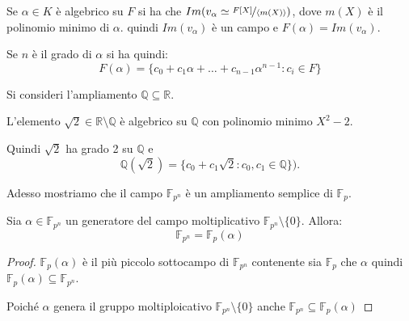 \documentclass[../main.tex]{subfiles}
\begin{document}
Se $\alpha \in K$ è algebrico su $F$ si ha che $Im(v_\alpha \simeq \nicefrac{F[X]}{\langle m(X)\rangle})$, dove $m(X)$ è il polinomio minimo di $\alpha$. quindi $Im(v_\alpha)$ è un campo e $F(\alpha) = Im(v_\alpha)$.

Se $n$ è il grado di $\alpha$ si ha quindi:
\begin{equation*}
    F(\alpha) = \{c_0 + c_1\alpha + \ldots + c_{n-1}\alpha^{n-1} : c_i \in F\}
\end{equation*}

\begin{example}
    Si consideri l'ampliamento $\mathbb{Q} \subseteq \mathbb{R}$.

    L'elemento $\sqrt{2}\in \mathbb{R} \setminus \mathbb{Q}$ è algebrico su $\mathbb{Q}$ con polinomio minimo $X^2 -2$.

    Quindi $\sqrt{2}$ ha grado 2 su $\mathbb{Q}$ e
    \begin{equation*}
        \mathbb{Q}(\sqrt{2}) = \{ c_0 + c_1 \sqrt{2} : c_0,c_1 \in \mathbb{Q}\}).
    \end{equation*}
\end{example}

Adesso mostriamo che il campo $\mathbb{F}_{p^n}$ è un ampliamento semplice di $\mathbb{F}_p$.
\begin{proposition}
    Sia $\alpha \in \mathbb{F}_{p^n}$ un generatore del campo moltiplicativo $\mathbb{F}_{p^n} \setminus \{0\}$. Allora:
    \begin{equation*}
        \mathbb{F}_{p^n} = \mathbb{F}_p(\alpha)
    \end{equation*}
\end{proposition}

\begin{proof}
    $\mathbb{F}_p(\alpha)$ è il più piccolo sottocampo di $\mathbb{F}_{p^n}$ contenente sia $\mathbb{F}_p$ che $\alpha$ quindi $\mathbb{F}_p(\alpha) \subseteq \mathbb{F}_{p^n}$.

    Poiché $\alpha$ genera il gruppo moltiploicativo $\mathbb{F}_{p^n} \setminus \{0\}$ anche $\mathbb{F}_{p^n} \subseteq \mathbb{F}_p(\alpha)$
\end{proof}
\end{document}
